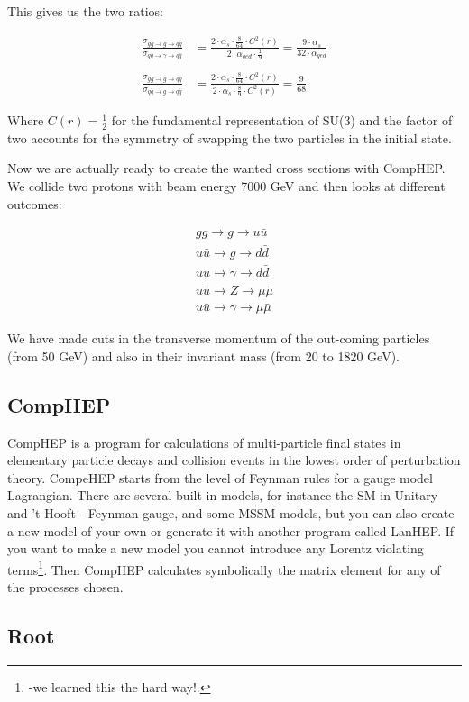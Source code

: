This gives us the two ratios:

\begin{align}
	\frac{\sigma_{gg \rightarrow g \rightarrow q \bar q}}{\sigma_{q \bar q \rightarrow \gamma \rightarrow q \bar q}} &=\frac{2 \cdot \alpha_{s} \cdot \frac{8}{64} \cdot C^{2}(r)}{2 \cdot \alpha_{qed} \cdot \frac{1}{9}}=\frac{9 \cdot  \alpha_{s} }{32 \cdot  \alpha_{qed} }\\ \nonumber \\
	\frac{\sigma_{gg \rightarrow g \rightarrow q \bar q}}{\sigma_{q \bar q \rightarrow g \rightarrow q \bar q}} &=\frac{2 \cdot \alpha_{s} \cdot \frac{8}{64} \cdot C^{2}(r)}{2 \cdot \alpha_{s} \cdot \frac{8}{9} \cdot C^{2}(r)}=\frac{9}{68}
\end{align}

Where $C(r) = \frac{1}{2}$ for the fundamental representation of SU(3) and the factor of two accounts for the symmetry of swapping the two particles in the initial state.

Now we are actually ready to create the wanted cross sections with CompHEP. We collide two protons with beam energy 7000 GeV and then looks at different outcomes:

\begin{align}
gg \rightarrow g \rightarrow u \bar u \nonumber \\ \nonumber
u \bar u \rightarrow g \rightarrow d \bar d \\ \nonumber
u \bar u \rightarrow \gamma \rightarrow d \bar d \\ \nonumber
u \bar u \rightarrow Z \rightarrow \mu \bar \mu \\ \nonumber
u \bar u \rightarrow \gamma \rightarrow \mu \bar \mu 
\end{align}

We have made cuts in the transverse momentum of the out-coming particles (from 50 GeV) and also in their invariant mass (from 20 to 1820 GeV). 

\subsection{CompHEP}

CompHEP is a program for calculations of multi-particle final states in elementary particle decays and collision events in the lowest order of perturbation theory. CompeHEP starts from the level of Feynman rules for a gauge model Lagrangian. There are several built-in models, for instance the SM in Unitary and 't-Hooft - Feynman gauge, and some MSSM models, but you can also create a new model of your own or generate it with another program called LanHEP. If you want to make a new model you cannot introduce any Lorentz violating terms\footnote{-we learned this the hard way!.}. Then CompHEP calculates symbolically the matrix element for any of the processes chosen. 

\subsection{Root}

